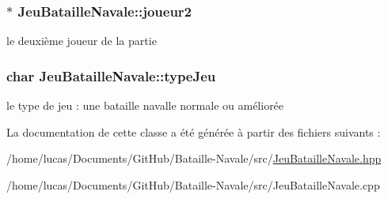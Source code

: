 \subsubsection[{\texorpdfstring{joueur2}{joueur2}}]{$\ast$ Jeu\+Bataille\+Navale\+::joueur2\hspace{0.3cm}{\ttfamily [private]}}\hypertarget{class_jeu_bataille_navale_a9b93aca9dd777873c307842a7e753dab}{}\label{class_jeu_bataille_navale_a9b93aca9dd777873c307842a7e753dab}
le deuxième joueur de la partie 
\subsubsection[{\texorpdfstring{type\+Jeu}{typeJeu}}]{\setlength{\rightskip}{0pt plus 5cm}char Jeu\+Bataille\+Navale\+::type\+Jeu\hspace{0.3cm}{\ttfamily [private]}}\hypertarget{class_jeu_bataille_navale_abac1f29d41caf119a9766f323506dbe0}{}\label{class_jeu_bataille_navale_abac1f29d41caf119a9766f323506dbe0}
le type de jeu \+: une bataille navalle normale ou améliorée 

La documentation de cette classe a été générée à partir des fichiers suivants \+:\begin{DoxyCompactItemize}
\item 
/home/lucas/\+Documents/\+Git\+Hub/\+Bataille-\/\+Navale/src/\hyperlink{_jeu_bataille_navale_8hpp}{Jeu\+Bataille\+Navale.\+hpp}\item 
/home/lucas/\+Documents/\+Git\+Hub/\+Bataille-\/\+Navale/src/Jeu\+Bataille\+Navale.\+cpp\end{DoxyCompactItemize}
